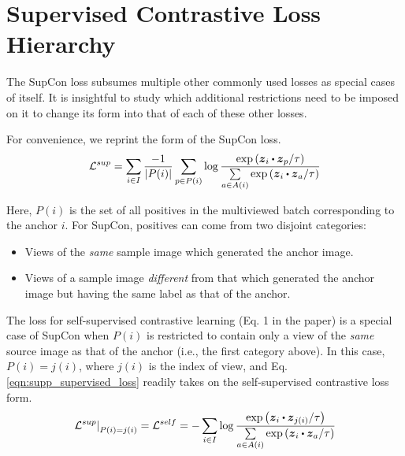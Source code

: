 \section{Supervised Contrastive Loss Hierarchy}

The SupCon loss subsumes multiple other commonly used losses as special cases of itself. It is insightful to study which additional restrictions need to be imposed on it to change its form into that of each of these other losses.

For convenience, we reprint the form of the SupCon loss.
\begin{equation}
  \mathcal{L}^{sup}
  =\sum_{i\in I}\frac{-1}{|P(i)|}\sum_{p\in P(i)}\log{\frac{\text{exp}\left(\boldsymbol{z}_i\bigcdot\boldsymbol{z}_p/\tau\right)}{\sum\limits_{a\in A(i)}\text{exp}\left(\boldsymbol{z}_i\bigcdot\boldsymbol{z}_a/\tau\right)}}
  \label{eqn:supp_supervised_loss}
\end{equation}

Here, $P(i)$ is the set of all positives in the multiviewed batch corresponding to the anchor $i$. For SupCon, positives can come from two disjoint categories:
\begin{itemize}
  \item Views of the \emph{same} sample image which generated the anchor image.
  \item Views of a sample image \emph{different} from that which generated the anchor image but having the same label as that of the anchor.
\end{itemize}

The loss for self-supervised contrastive learning (Eq. 1 in the paper) is a special case of SupCon when $P(i)$ is restricted to contain only a view of the \emph{same} source image as that of the anchor (i.e., the first category above). In this case, $P(i)=j(i)$, where $j(i)$ is the index of view, and Eq. \ref{eqn:supp_supervised_loss} readily takes on the self-supervised contrastive loss form.
\begin{equation}
  \left.\mathcal{L}^{sup}\right|_{P(i)=j(i)}
  =\mathcal{L}^{self}
  =-\sum_{i\in I}\log{
  \frac{\text{exp}\left(\boldsymbol{z}_i\bigcdot\boldsymbol{z}_{j(i)}/\tau\right)}{\sum\limits_{a\in A(i)}\text{exp}\left(\boldsymbol{z}_i\bigcdot\boldsymbol{z}_a/\tau\right)}
  }
  \label{eqn:supp_self_loss}
\end{equation}

